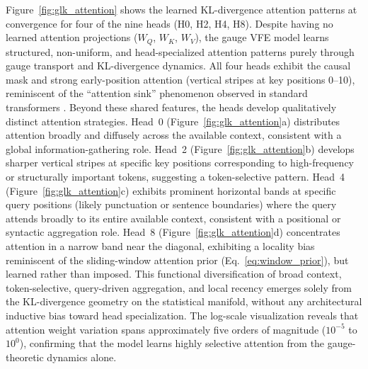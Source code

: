 \documentclass[twoside,11pt]{article}
\begin{document}
Figure~\ref{fig:glk_attention} shows the learned KL-divergence attention patterns at convergence for four of the nine heads (H0, H2, H4, H8). Despite having no learned attention projections ($W_Q$, $W_K$, $W_V$), the gauge VFE model learns structured, non-uniform, and head-specialized attention patterns purely through gauge transport and KL-divergence dynamics. All four heads exhibit the causal mask and strong early-position attention (vertical stripes at key positions 0--10), reminiscent of the ``attention sink'' phenomenon observed in standard transformers \citep{xiao2024efficient}. Beyond these shared features, the heads develop qualitatively distinct attention strategies. Head~0 (Figure~\ref{fig:glk_attention}a) distributes attention broadly and diffusely across the available context, consistent with a global information-gathering role. Head~2 (Figure~\ref{fig:glk_attention}b) develops sharper vertical stripes at specific key positions corresponding to high-frequency or structurally important tokens, suggesting a token-selective pattern. Head~4 (Figure~\ref{fig:glk_attention}c) exhibits prominent horizontal bands at specific query positions (likely punctuation or sentence boundaries) where the query attends broadly to its entire available context, consistent with a positional or syntactic aggregation role. Head~8 (Figure~\ref{fig:glk_attention}d) concentrates attention in a narrow band near the diagonal, exhibiting a locality bias reminiscent of the sliding-window attention prior (Eq.~\ref{eq:window_prior}), but learned rather than imposed. This functional diversification of broad context, token-selective, query-driven aggregation, and local recency emerges solely from the KL-divergence geometry on the statistical manifold, without any architectural inductive bias toward head specialization. The log-scale visualization reveals that attention weight variation spans approximately five orders of magnitude ($10^{-5}$ to $10^{0}$), confirming that the model learns highly selective attention from the gauge-theoretic dynamics alone.
\end{document}
